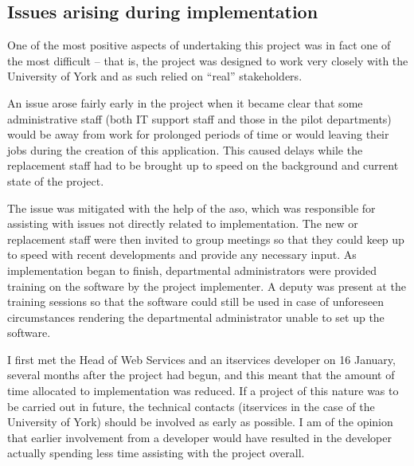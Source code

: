 
\subsection{Issues arising during implementation}
\label{sec:issuesarising}


\mynobreakpar

One of the most positive aspects of undertaking this project was in fact one
of the most difficult -- that is, the project was designed to work very
closely with the University of York and as such relied on ``real''
stakeholders.

An issue arose fairly early in the project when it became clear that some
administrative staff (both IT support staff and those in the pilot
departments) would be away from work for prolonged periods of time or would
leaving their jobs during the creation of this application. This caused delays
while the replacement staff had to be brought up to speed on the background
and current state of the project.

The issue was mitigated with the help of the \gls{aso}, which was responsible
for assisting with issues not directly related to implementation. The new or
replacement staff were then invited to group meetings so that they could keep
up to speed with recent developments and provide any necessary input. As
implementation began to finish, departmental administrators were provided
training on the software by the project implementer. A deputy was present at
the training sessions so that the software could still be used in case of
unforeseen circumstances rendering the departmental administrator unable to
set up the software.

\mynobreakpar

I first met the Head of Web Services and an \gls{itservices} developer on 16
January, several months after the project had begun, and this meant that the
amount of time allocated to implementation was reduced. If a project of this
nature was to be carried out in future, the technical contacts
(\gls{itservices} in the case of the University of York) should be involved as
early as possible. I am of the opinion that earlier involvement from a
developer would have resulted in the developer actually spending less time
assisting with the project overall.

